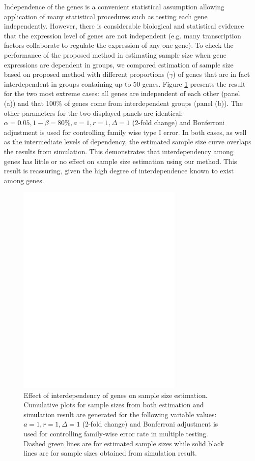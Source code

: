 \documentclass{bioinfo}
\begin{document}
Independence of the genes is a convenient statistical assumption
allowing application of many statistical procedures such as
testing each gene independently. However, there is considerable
biological and statistical evidence that the expression level of
genes are not independent (e.g. many transcription factors
collaborate to regulate the expression of any one gene). To check
the performance of the proposed method in estimating sample size
when gene expressions are dependent in groups, we compared
estimation of sample size based on proposed method with different
proportions ($\gamma$) of genes that are in fact interdependent in
groups containing up to 50 genes. Figure \ref{fig:ResDep} presents
the result for the two most extreme cases: all genes are
independent of each other (panel (a)) and that 100\% of genes come
from interdependent groups (panel (b)). The other parameters for
the two displayed panels are identical: $\alpha = 0.05, 1 - \beta
= 80\%, a = 1, r = 1, \Delta = 1$ (2-fold change) and Bonferroni
adjustment is used for controlling family wise type I error. In
both cases, as well as the intermediate levels of dependency, the
estimated sample size curve overlaps the results from simulation.
This demonstrates that interdependency among genes has little or
no effect on sample size estimation using our method. This result
is reassuring, given the high degree of interdependence known to
exist among genes.

\begin{figure}[h]
  \centerline{\includegraphics*[width=3.2in]{ResDepF.pdf}} %
  \caption[Effect of interdependency of genes on sample size estimation]
  {Effect of interdependency of genes on sample size estimation.
    Cumulative plots for sample sizes from both estimation and simulation result
    are generated for the following variable values: $a = 1, r = 1, \Delta = 1$ (2-fold
    change) and Bonferroni adjustment is used for controlling family-wise error rate in multiple testing. Dashed green lines are for estimated sample sizes
    while solid black lines are for sample sizes obtained from simulation result.}
  \label{fig:ResDep}
\end{figure}
\end{document}
